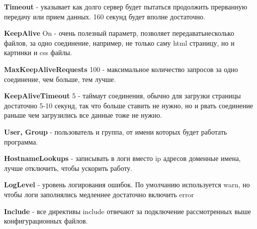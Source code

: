 \documentclass[14pt, a4paper]{article}
\begin{document}
\begin{figure}[h]%
    \centering
    \label{1.4}
\end{figure}
\textbf{Timeout} - указывает как долго сервер будет пытаться продолжить прерванную передачу или прием 
данных. 160 секунд будет вполне достаточно.

\textbf{KeepAlive} On - очень полезный параметр, позволяет передавать\linebreak несколько файлов, за одно 
соединение, например, не только саму html страницу, но и картинки и css файлы.

\textbf{MaxKeepAliveRequests} 100 - максимальное количество запросов за одно соединение, чем больше, тем лучше.

\textbf{KeepAliveTimeout} 5 - таймаут соединения, обычно для загрузки страницы достаточно 5-10 секунд, 
так что больше ставить не нужно, но и рвать соединение раньше чем загрузились все данные тоже не нужно.

\textbf{User, Group} - пользователь и группа, от имени которых будет работать программа.

\textbf{HostnameLookups} - записывать в логи вместо ip адресов доменные имена, лучше отключить, чтобы ускорить работу.

\textbf{LogLevel} - уровень логирования ошибок. По умолчанию используется warn, 
но чтобы логи заполнялись медленнее достаточно включить error

\textbf{Include} - все директивы include отвечают за подключение рассмотренных выше конфигурационных файлов.
\end{document}
